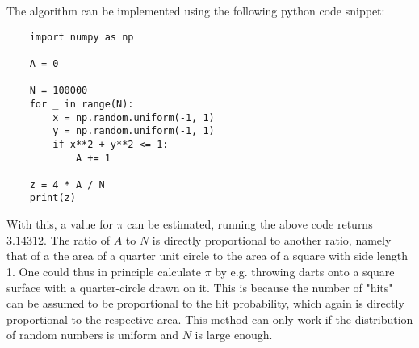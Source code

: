 The algorithm can be implemented using the following python code snippet: \\
\begin{lstlisting}
    import numpy as np
    
    A = 0
    
    N = 100000
    for _ in range(N):
        x = np.random.uniform(-1, 1)
        y = np.random.uniform(-1, 1)
        if x**2 + y**2 <= 1:
            A += 1
    
    z = 4 * A / N
    print(z) \end{lstlisting}
With this, a value for $\pi$ can be estimated, running the above code 
returns $3.14312$. The ratio of $A$ to $N$ is 
directly proportional to another ratio, namely that of a the area of a 
quarter unit circle to the area of a square with side length 1. One could thus 
in principle calculate $\pi$ by e.g. throwing darts onto a square surface with 
a quarter-circle drawn on it. This is because the number of "hits" can be 
assumed to be proportional to the hit probability, which again is directly 
proportional to the respective area. This method can only work if the 
distribution of random numbers is uniform and $N$ is large enough.

